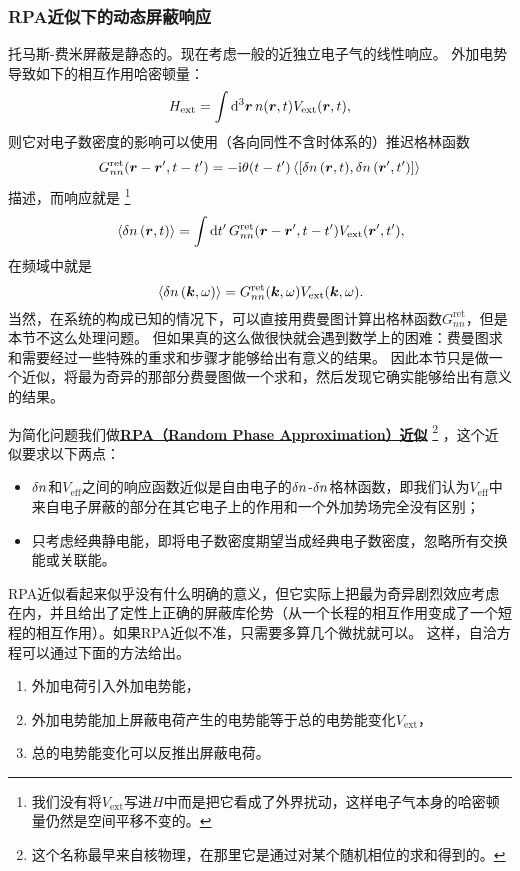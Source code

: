 \documentclass[hyperref, UTF8, a4paper]{ctexart}
\newcommand*{\ii}{\mathrm{i}}
\newcommand*{\concept}[1]{\underline{\textbf{#1}}}
\begin{document}
\subsubsection{RPA近似下的动态屏蔽响应}

托马斯-费米屏蔽是静态的。现在考虑一般的近独立电子气的线性响应。
外加电势导致如下的相互作用哈密顿量：
\[
    {H}_\text{ext} = \int \dd[3]{\vb*{r}} {n}(\vb*{r}, t) V_\text{ext} (\vb*{r}, t),
\]
则它对电子数密度的影响可以使用（各向同性不含时体系的）推迟格林函数
\[
    G^\text{ret}_{nn}(\vb*{r}-\vb*{r}', t-t') = - \ii \theta(t-t') \expval*{\comm{\var{{n}}(\vb*{r}, t)}{\var{{n}}(\vb*{r}', t')}}
\]
描述，而响应就是%
\footnote{我们没有将$V_\text{ext}$写进${H}$中而是把它看成了外界扰动，这样电子气本身的哈密顿量仍然是空间平移不变的。}%
\begin{equation}
    \expval*{\var{{n}}(\vb*{r}, t)} = \int \dd{t'} G^\text{ret}_{nn}(\vb*{r}-\vb*{r}', t-t') V_\text{ext}(\vb*{r}', t'),
\end{equation}
在频域中就是
\begin{equation}
    \expval*{\var{{n}}(\vb*{k}, \omega)} = G^\text{ret}_{nn}(\vb*{k}, \omega) V_\text{ext}(\vb*{k}, \omega).
    \label{eq:green-function-electro-shielding}
\end{equation}
当然，在系统的构成已知的情况下，可以直接用费曼图计算出格林函数$G^\text{ret}_{nn}$，但是本节不这么处理问题。
但如果真的这么做很快就会遇到数学上的困难：费曼图求和需要经过一些特殊的重求和步骤才能够给出有意义的结果。
因此本节只是做一个近似，将最为奇异的那部分费曼图做一个求和，然后发现它确实能够给出有意义的结果。

为简化问题我们做\concept{RPA（Random Phase Approximation）近似}%
\footnote{这个名称最早来自核物理，在那里它是通过对某个随机相位的求和得到的。}%
，这个近似要求以下两点：
\begin{itemize}
    \item $\var{{n}}$和$V_\text{eff}$之间的响应函数近似是自由电子的$\var{{n}}$-$\var{{n}}$格林函数，即我们认为$V_\text{eff}$中来自电子屏蔽的部分在其它电子上的作用和一个外加势场完全没有区别；
    \item 只考虑经典静电能，即将电子数密度期望当成经典电子数密度，忽略所有交换能或关联能。
\end{itemize}
RPA近似看起来似乎没有什么明确的意义，但它实际上把最为奇异剧烈效应考虑在内，并且给出了定性上正确的屏蔽库伦势（从一个长程的相互作用变成了一个短程的相互作用）。如果RPA近似不准，只需要多算几个微扰就可以。
这样，自洽方程可以通过下面的方法给出。
\begin{enumerate}
    \item 外加电荷引入外加电势能，
    \item 外加电势能加上屏蔽电荷产生的电势能等于总的电势能变化$V_\text{ext}$，
    \item 总的电势能变化可以反推出屏蔽电荷。
\end{enumerate}
\end{document}
